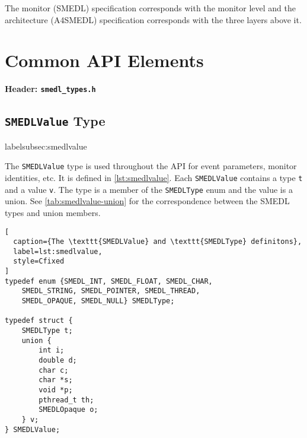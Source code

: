 \documentclass[paper=letter,titlepage,captions=tableheading]{scrartcl}
\begin{document}
The monitor (SMEDL) specification corresponds with the monitor level and the
architecture (A4SMEDL) specification corresponds with the three layers above
it.

\section{Common API Elements}
\label{sec:common}

\textbf{Header: \texttt{smedl\_types.h}}

\subsection{\texttt{SMEDLValue} Type}
label{subsec:smedlvalue}

The \texttt{SMEDLValue} type is used throughout the API for event parameters,
monitor identities, etc. It is defined in \autoref{lst:smedlvalue}. Each 
\texttt{SMEDLValue} contains a type \texttt{t} and a value \texttt{v}. The type
is a member of the \texttt{SMEDLType} enum and the value is a union. See
\autoref{tab:smedlvalue-union} for the correspondence between the SMEDL types
and union members.

\begin{lstlisting}[
  caption={The \texttt{SMEDLValue} and \texttt{SMEDLType} definitons},
  label=lst:smedlvalue,
  style=Cfixed
]
typedef enum {SMEDL_INT, SMEDL_FLOAT, SMEDL_CHAR,
    SMEDL_STRING, SMEDL_POINTER, SMEDL_THREAD,
    SMEDL_OPAQUE, SMEDL_NULL} SMEDLType;

typedef struct {
    SMEDLType t;
    union {
        int i;
        double d;
        char c;
        char *s;
        void *p;
        pthread_t th;
        SMEDLOpaque o;
    } v;
} SMEDLValue;
\end{lstlisting}

\end{document}
